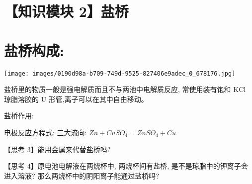 \documentclass[10pt]{article}
\begin{document}
\section*{【知识模块 2】盐桥}

\section*{盐桥构成:}

\begin{center}
\texttt{[image: images/0190d98a-b709-749d-9525-827406e9adec\_0\_678176.jpg]}
\end{center}

盐桥里的物质一般是强电解质而且不与两池中电解质反应, 常使用装有饱和 \(\mathrm{{KCl}}\) 琼脂溶胶的 \(\mathrm{U}\) 形管,离子可以在其中自由移动。

盐桥作用:

电极反应方程式: 三大流向: \({Zn} + {CuS}{O}_{4} = {ZnS}{O}_{4} + {Cu}\)

【思考 3】能用金属来代替盐桥吗?

【思考 4】原电池电解液在两烧杯中, 两烧杯间有盐桥, 是不是琼脂中的钾离子会进入溶液? 那么两烧杯中的阴阳离子能通过盐桥吗?
\end{document}
